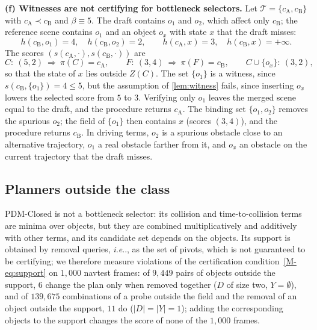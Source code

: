 \documentclass[10pt,letterpaper]{article}
\makeatletter
\DeclareRobustCommand\onedot{\futurelet\@let@token\@onedot}
\def\@onedot{\ifx\@let@token.\else.\null\fi\xspace}
\def\ie{\emph{i.e}\onedot} \def\Ie{\emph{I.e}\onedot}
\newcommand{\draft}{C}
\newcommand{\full}{F}
\newcommand{\field}{Z}
\newcommand{\policy}{\pi}
\theoremstyle{remark}
\theoremstyle{plain}
\theoremstyle{definition}
\makeatother
\begin{document}
\textbf{(f) Witnesses are not certifying for bottleneck selectors.}
Let $\mathcal{T}=\{c_\mathrm{A},c_\mathrm{B}\}$ with $c_\mathrm{A}\prec c_\mathrm{B}$ and $\beta\equiv5$.
The draft contains $o_1$ and $o_2$, which affect only $c_\mathrm{B}$; the reference scene contains $o_1$ and an object $o_x$ with state $x$ that the draft misses:
\begin{equation*}
h(c_\mathrm{B},o_1)=4,\quad h(c_\mathrm{B},o_2)=2,\qquad h(c_\mathrm{A},x)=3,\quad h(c_\mathrm{B},x)=+\infty .
\end{equation*}
The scores $(s(c_\mathrm{A},\cdot),s(c_\mathrm{B},\cdot))$ are
\begin{equation*}
\draft:\ (5,2)\ \Rightarrow\ \policy(\draft)=c_\mathrm{A},\qquad
\full:\ (3,4)\ \Rightarrow\ \policy(\full)=c_\mathrm{B},\qquad
\draft\cup\{o_x\}:\ (3,2),
\end{equation*}
so that the state of $x$ lies outside $\field(\draft)$.
The set $\{o_1\}$ is a witness, since $s(c_\mathrm{B},\{o_1\})=4\le5$, but the assumption of \cref{lem:witness} fails, since inserting $o_x$ lowers the selected score from $5$ to $3$.
Verifying only $o_1$ leaves the merged scene equal to the draft, and the procedure returns $c_\mathrm{A}$.
The binding set $\{o_1,o_2\}$ removes the spurious $o_2$; the field of $\{o_1\}$ then contains $x$ (scores $(3,4)$), and the procedure returns $c_\mathrm{B}$.
In driving terms, $o_2$ is a spurious obstacle close to an alternative trajectory, $o_1$ a real obstacle farther from it, and $o_x$ an obstacle on the current trajectory that the draft misses.

\subsection{Planners outside the class}
\label{sec:consumers_outside}

PDM-Closed is not a bottleneck selector: its collision and time-to-collision terms are minima over objects, but they are combined multiplicatively and additively with other terms, and its candidate set depends on the objects.
Its support is obtained by removal queries, \ie, as the set of pivots, which is not guaranteed to be certifying; we therefore measure violations of the certification condition~\cref*{M-eq:support} on $1{,}000$ navtest frames: of $9{,}449$ pairs of objects outside the support, $6$ change the plan only when removed together ($D$ of size two, $Y=\emptyset$), and of $139{,}675$ combinations of a probe outside the field and the removal of an object outside the support, $11$ do ($|D|=|Y|=1$); adding the corresponding objects to the support changes the score of none of the $1{,}000$ frames.
\end{document}
